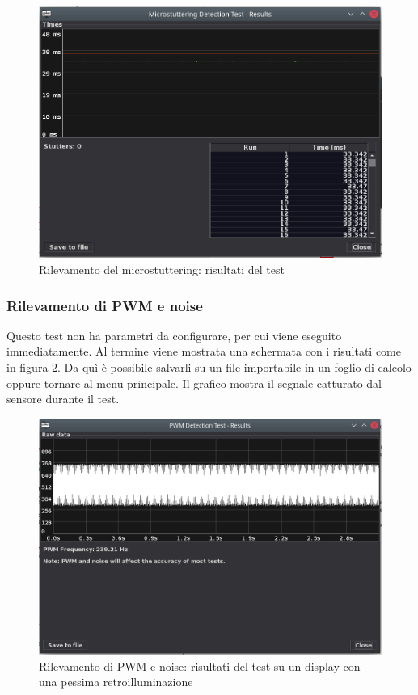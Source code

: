 \begin{figure}[H]
	\centering
	\includegraphics[width=\textwidth]{Applicazione_files/gui_microstuttering_results.png}
	\caption{Rilevamento del microstuttering: risultati del test}
	\label{fig:gui_microstuttering_results}
\end{figure}

\subsubsection{Rilevamento di PWM e noise}
Questo test non ha parametri da configurare, per cui viene eseguito immediatamente. Al termine viene mostrata una schermata con i risultati come in figura \ref{fig:gui_pwm_results}. Da quì è possibile salvarli su un file importabile in un foglio di calcolo oppure tornare al menu principale. Il grafico mostra il segnale catturato dal sensore durante il test.

\begin{figure}[H]
	\centering
	\includegraphics[width=\textwidth]{Applicazione_files/gui_pwm_results.png}
	\caption{Rilevamento di PWM e noise: risultati del test su un display con una pessima retroilluminazione}
	\label{fig:gui_pwm_results}
\end{figure}

